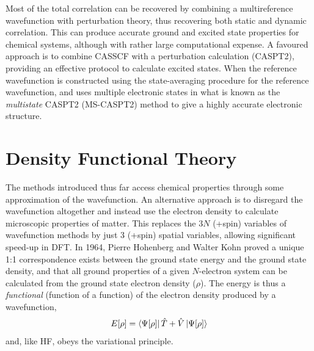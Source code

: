 Most of the total correlation can be recovered by combining a multireference wavefunction with perturbation theory, thus recovering both static and dynamic correlation. This can produce accurate ground and excited state properties for chemical systems, although with rather large computational expense.\cite{Ramos-Cordoba2017,Stein2016a} A favoured approach is to combine \ac{CAS}\ac{SCF} with a perturbation calculation (\ac{CAS}\ac{PT2}), providing an effective protocol to calculate excited states.\cite{Andersson1992} When the reference wavefunction is constructed using the state-averaging procedure for the reference wavefunction, and uses multiple electronic states in what is known as the  \textit{multistate} CASPT2 (MS-CASPT2) method to give a highly accurate electronic structure.\cite{FINLEY1998299}

\section{Density Functional Theory}\label{section: theory_dft}
The methods introduced thus far access chemical properties through some approximation of the wavefunction. An alternative approach is to disregard the wavefunction altogether and instead use the electron density to calculate microscopic properties of matter. This replaces the 3$N$ (+spin) variables of wavefunction methods by just 3 (+spin) spatial variables, allowing significant speed-up in \ac{DFT}. In 1964, Pierre Hohenberg and Walter Kohn proved a unique 1:1 correspondence exists between the ground state energy and the ground state density, and that all ground properties of a given $N$-electron system can be calculated from the ground state electron density ($\rho$).\cite{Kohn1964} The energy is thus a \textit{functional} (function of a function) of the electron density produced by a wavefunction,
\begin{equation}
    E[\rho]=\bra{\Psi[\rho]}\hat{T}+\hat{V}\ket{\Psi[\rho]}
\end{equation}
and, like \ac{HF}, obeys the variational principle.

